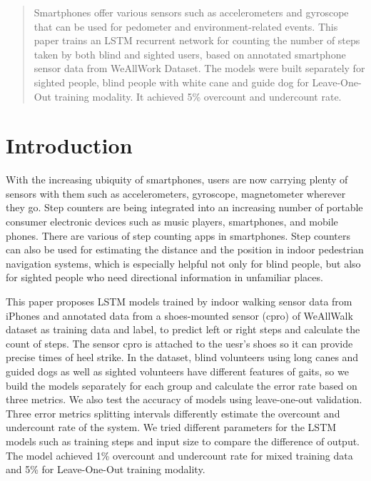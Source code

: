 \documentclass[11pt]{article}
\begin{document}
{\begin{abstract}
Smartphones offer various sensors such as accelerometers and gyroscope that can be used for pedometer and environment-related events. This paper trains an LSTM recurrent network for counting the number of steps taken by both blind and sighted users, based on annotated smartphone sensor data from WeAllWork Dataset. The models were built separately for sighted people, blind people with white cane and guide dog for Leave-One-Out training modality. It achieved 5\% overcount and undercount rate.

\end{abstract}

\section{Introduction}

With the increasing ubiquity of smartphones, users are now carrying  plenty of sensors with them such as accelerometers, gyroscope, magnetometer wherever they go. Step counters are being integrated into an increasing number of portable consumer electronic devices such as music players, smartphones, and mobile phones. There are various of step counting apps in smartphones. Step counters can also be used for estimating the distance and the position in indoor pedestrian navigation systems, which is especially helpful not only for blind people, but also for sighted people who need directional information in unfamiliar places.

This paper proposes LSTM models trained by indoor walking sensor data from iPhones and annotated data from a shoes-mounted sensor (cpro) of WeAllWalk dataset as training data and label, to predict left or right steps and calculate the count of steps. The sensor cpro is attached to the uesr's shoes so it can provide precise times of heel strike. In the dataset, blind volunteers using long canes and guided dogs as well as sighted volunteers have different features of gaits, so we build the models separately for each group and calculate the error rate based on three metrics. We also test the accuracy of models using leave-one-out validation. Three error metrics splitting intervals differently estimate the overcount and undercount rate of the system. We tried different parameters for the LSTM models such as training steps and input size to compare the difference of output. The model achieved 1\% overcount and undercount rate for mixed training data and 5\% for Leave-One-Out training modality.



}
\end{document}
